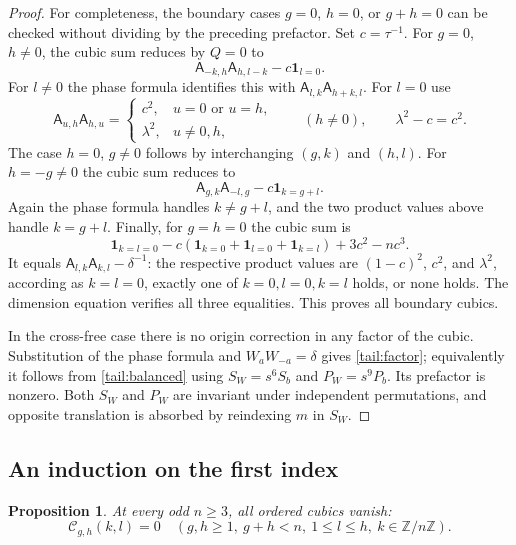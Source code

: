 \documentclass[11pt]{article}
\numberwithin{equation}{section}
\newtheorem{proposition}[theorem]{Proposition}
\theoremstyle{definition}
\theoremstyle{remark}
\begin{document}
\begin{proof}
For completeness, the boundary cases $g=0$, $h=0$, or $g+h=0$
can be checked without dividing by the preceding prefactor.
Set $c=\tau^{-1}$.  For $g=0$, $h\ne0$, the cubic sum reduces
by $Q=0$ to
\[
 \mathsf A_{-k,h}\mathsf A_{h,l-k}-c\mathbf1_{l=0}.
\]
For $l\ne0$ the phase formula identifies this with
$\mathsf A_{l,k}\mathsf A_{h+k,l}$.  For $l=0$ use
\[
 \mathsf A_{u,h}\mathsf A_{h,u}=
 \begin{cases}c^2,&u=0\text{ or }u=h,\\
               \lambda^2,&u\ne0,h,
 \end{cases}
 \qquad (h\ne0),\qquad \lambda^2-c=c^2.
\]
The case $h=0$, $g\ne0$ follows by interchanging $(g,k)$
and $(h,l)$.  For $h=-g\ne0$ the cubic sum reduces to
\[
 \mathsf A_{g,k}\mathsf A_{-l,g}-c\mathbf1_{k=g+l}.
\]
Again the phase formula handles $k\ne g+l$, and the two
product values above handle $k=g+l$.
Finally, for $g=h=0$ the cubic sum is
\[
 \mathbf1_{k=l=0}
 -c(\mathbf1_{k=0}+\mathbf1_{l=0}+\mathbf1_{k=l})
 +3c^2-nc^3.
\]
It equals $\mathsf A_{l,k}\mathsf A_{k,l}-\delta^{-1}$:
the respective product values are $(1-c)^2$, $c^2$, and
$\lambda^2$, according as $k=l=0$, exactly one of
$k=0,l=0,k=l$ holds, or none holds.  The dimension equation
verifies all three equalities.  This proves all boundary cubics.

In the cross-free case there is no origin correction in any
factor of the cubic.  Substitution of the phase formula and
$W_aW_{-a}=\delta$ gives \eqref{tail:factor}; equivalently it
follows from \eqref{tail:balanced} using $S_W=s^6S_b$ and
$P_W=s^9P_b$.  Its prefactor is nonzero.  Both $S_W$ and $P_W$
are invariant under independent permutations, and opposite
translation is absorbed by reindexing $m$ in $S_W$.
\end{proof}

\subsection{An induction on the first index}

\begin{proposition}\label{tail:ordered}
At every odd $n\ge3$, all ordered cubics vanish:
\[
 \mathcal C_{g,h}(k,l)=0\quad
 (g,h\ge1,\ g+h<n,\ 1\le l\le h,\ k\in\mathbb Z/n\mathbb Z).
\]
\end{proposition}
\end{document}
